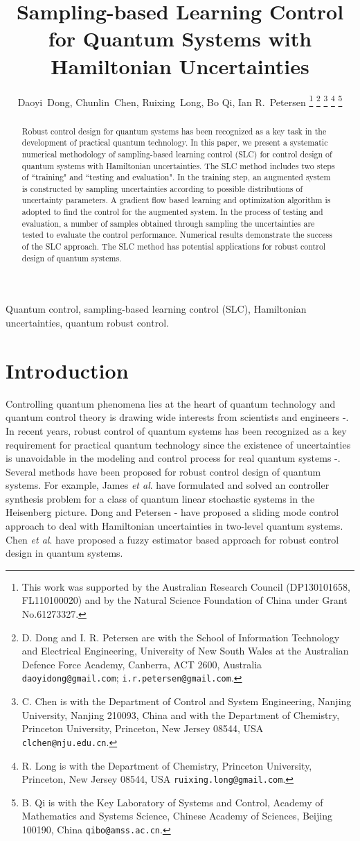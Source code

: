 \documentclass[letterpaper, 10 pt, conference]{ieeeconf}
\title{\LARGE \bf
Sampling-based Learning Control for Quantum Systems with Hamiltonian Uncertainties}
\author{Daoyi~Dong, Chunlin~Chen, Ruixing~Long, Bo Qi, Ian R.~Petersen
\thanks{This work was supported by the Australian Research Council (DP130101658, FL110100020)
and by the Natural Science
Foundation of China under Grant No.61273327.}
\thanks{D. Dong  and I. R. Petersen are with the School of Information Technology and Electrical
Engineering, University of New South Wales at the Australian Defence
Force Academy, Canberra, ACT 2600, Australia {\tt\small daoyidong@gmail.com}; {\tt\small i.r.petersen@gmail.com}.}
\thanks{C. Chen is with the Department of Control and System Engineering, Nanjing
University, Nanjing 210093, China and with the Department of
Chemistry, Princeton University, Princeton, New Jersey 08544, USA
{\tt\small clchen@nju.edu.cn}.}
\thanks{R. Long is with the Department of
Chemistry, Princeton University, Princeton, New Jersey 08544, USA
{\tt\small ruixing.long@gmail.com}.}
\thanks{B. Qi is with the Key Laboratory of Systems and Control,
Academy of Mathematics and Systems Science, Chinese Academy
of Sciences, Beijing 100190, China {\tt\small qibo@amss.ac.cn}.}
}
\begin{document}
\maketitle
\begin{abstract}
Robust control design for quantum systems has been recognized as a key task in the development of practical quantum technology. In this
paper, we present a systematic numerical methodology of sampling-based
learning control (SLC) for control design of quantum systems with Hamiltonian uncertainties.
The SLC method includes two steps of ``training" and ``testing and
evaluation". In the training step, an augmented system is
constructed by sampling uncertainties according to possible
distributions of uncertainty parameters. A gradient flow based
learning and optimization algorithm is adopted to find the control
for the augmented system. In the process of testing and
evaluation, a number of samples obtained through sampling the uncertainties are tested to
evaluate the control performance. Numerical results
demonstrate the success of the SLC
approach. The SLC method has potential applications for robust control design of
quantum systems.
\end{abstract}

\begin{keywords}
Quantum control, sampling-based learning
control (SLC), Hamiltonian uncertainties, quantum robust control.
\end{keywords}

\section{Introduction}\label{Sec1}
Controlling quantum phenomena lies at the heart of quantum technology and quantum
control theory is drawing wide interests from scientists and engineers
\cite{Dong and Petersen 2010IET}-\cite{Brif et al 2010}. In recent years, robust control of quantum systems has been recognized as a key requirement
for practical quantum technology since the existence of uncertainties is unavoidable in the modeling and control process for real quantum
systems \cite{Pravia et al 2003}-\cite{James 2004}. Several methods have been
proposed for robust control design of quantum systems. For example,
James \emph{et al}. \cite{James et al 2007} have formulated and
solved an  controller synthesis problem for a class of
quantum linear stochastic systems in the Heisenberg picture. Dong
and Petersen \cite{Dong and Petersen 2009NJP}-\cite{Dong and Petersen 2011IFAC} have proposed a sliding mode control
approach to deal with Hamiltonian uncertainties in two-level quantum systems. Chen
\emph{et al}. \cite{Chen et al 2012} have proposed a fuzzy estimator based approach
for robust control design in quantum systems.
\end{document}
